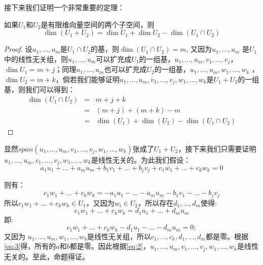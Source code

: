 \documentclass[10pt,a4paper,UTF8]{article}
\begin{document}
接下来我们证明一个非常重要的定理：
\begin{theorem}
如果\(U_{1}\)和\(U_{2}\)是有限维向量空间的两个子空间，则\[\dim (U_{1} + U_{2}) = \dim U_{1} + \dim U_{2} -\dim (U_{1}\cap U_{2})\]
\end{theorem}
\begin{proof}
设\(u_{1},\ldots ,u_{m}\)是\(U_{1}\cap U_{2}\)的基，则\(\dim (U_{1}\cap U_{2}) = m\), 又因为\(u_{1},\ldots ,u_{m}\) 是\(U_{1}\)中的线性无关组，则\(u_{1},\ldots ,u_{m}\)可以扩充成\(U_{1}\)的一组基，\(u_{1},\ldots ,u_{m},v_{1},\ldots ,v_{j}\)，\(\dim U_{1} = m + j\)；同理\(u_{1},\ldots ,u_{m}\)也可以扩充成\(U_{2}\)的一组基，\(u_{1},\ldots ,u_{m},w_{1},\ldots ,w_{k}\) ，\(\dim U_{2} = m + k\)，倘若我们能够证明\(u_{1},\ldots ,u_{m},v_{1},\ldots ,v_{j},w_{1},\ldots ,w_{k}\)是\(U_{1} + U_{2}\)的一组基，则我们可以得到：
\begin{eqnarray*}
\dim(U_{1} \cap U_{2}) &= & m + j + k \\
&=& (m+j) + (m+k) -m \\
&=& \dim(U_{1}) + \dim(U_{2}) - \dim(U_{1}\cap U_{2})
\end{eqnarray*}
\end{proof}
显然\(span(u_{1},\ldots ,u_{m},v_{1},\ldots ,v_{j},w_{1},\ldots ,w_{k})\)张成了\(U_{1} + U_{2}\)，接下来我们只需要证明\(u_{1},\ldots ,u_{m},v_{1},\ldots ,v_{j},w_{1},\ldots ,w_{k}\)是线性无关的。为此我们假设：
\begin{equation}
\label{eq:2}
a_{1}u_{1} + \ldots +a_{m}u_{m} + b_{1}v_{1} + \ldots + b_{j}v_{j} + c_{1}w_{1} + \ldots + c_{k}w_{k} = 0
\end{equation}

则有：
\begin{equation}
\label{eq:3}
c_{1}w_{1} + \ldots + c_{k}w_{k} = -a_{1}u_{1} - \ldots -a_{m}u_{m} - b_{1}v_{1} - \ldots - b_{j}v_{j}  
\end{equation}
所以\(c_{1}w_{1} + \ldots + c_{k}w_{k}\in U_{1}\)，又因为\(w_{i}\in U_{2}\)，所以存在\(d_{1},\ldots ,d_{m}\)使得:
\begin{equation}
\label{eq:4}
c_{1}w_{1} + \ldots + c_{k}w_{k} = d_{1}u_{1} + \ldots +d_{m}u_{m}
\end{equation}
即:
\begin{equation}
\label{eq:5}
c_{1}w_{1} + \ldots + c_{k}w_{k} - d_{1}u_{1} - \ldots -d_{m}u_{m} = 0;
\end{equation}
又因为 \(u_{1},\ldots ,u_{m},w_{1},\ldots ,w_{k}\)是线性无关组，所以\(c_{1},\ldots ,c_{k},d_{1},\ldots ,d_{m}\)都是零。根据\ref{eq:3}得，所有的\(a\)和\(b\)都是零。因此根据\ref{eq:2}，\(u_{1},\ldots ,u_{m},v_{1},\ldots ,v_{j},w_{1},\ldots ,w_{k}\)是线性无关的。至此，命题得证。
\end{document}
